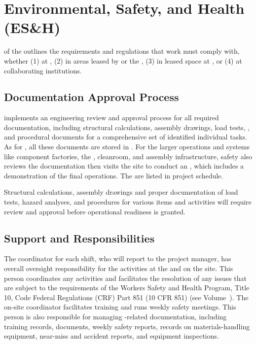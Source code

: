 \section{Environmental, Safety, and Health (ES\&H)}
\label{sec:fdsp-tc-safety}

 \tcchesh of the   outlines the requirements and regulations that  work must comply with, whether (1) at , (2) in areas  leased by  or the , (3) in leased space at , or (4) at collaborating institutions.
 
\subsection{Documentation Approval Process}


 implements an engineering review and approval process for all required documentation, including structural calculations, assembly drawings, load tests, , and procedural documents for a comprehensive set of identified individual tasks. 
As for , all these documents are stored in . 
For the larger operations and systems like  component factories, the , cleanroom, and assembly infrastructure,  safety also reviews the documentation then visits the site to conduct
 an , which includes a demonstration of the final operations. The  are listed in project schedule. 
 
 Structural calculations, assembly drawings and proper documentation of  load tests, hazard analyses, and procedures for various items and activities will require review and approval before operational readiness is granted. 

 
\subsection{Support and Responsibilities}

The  coordinator for each shift, who will report to the  project  manager, has overall  oversight responsibility for the  activities at the   and on the  site. 
This person coordinates any  activities and facilitates the resolution of any issues that are subject to the requirements of the  Workers Safety and Health Program, Title 10, Code Federal Regulations (CRF) Part 851 (10 CFR 851) (see Volume~\volnumbertc{}).  The on-site  coordinator facilitates training and runs weekly safety meetings. This  person is also responsible for managing -related  documentation, including training records,  documents, weekly safety reports, records on materials-handling equipment, near-miss and accident reports, and equipment inspections. 

